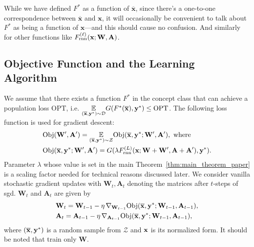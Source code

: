 While we have defined $F^*$ as a function of $\overline{\mathbf{x}}$, since there's a one-to-one correspondence between $\overline{\mathbf{x}}$ and $\mathbf{x}$, it will occasionally be convenient to talk about $F^*$ as being a function of $\mathbf{x}$---and this should cause no confusion. And similarly for other functions like $F_{\mathrm{rnn}}^{(\ell)}(\mathbf{x}; \mathbf{W}, \mathbf{A})$.

\subsection{Objective Function and the Learning Algorithm}
We assume that there exists a function $F^{\ast}$ in the concept class that can achieve a population loss $\mathrm{OPT}$, i.e. $\underset{\left(\overline{\mathbf{x}}, \mathbf{y}^{\ast}\right) \sim \mathcal{D}}{\mathbb{E}} G(F^{\ast}(\overline{\mathbf{x}}), \mathbf{y}^{\ast}) \le \mathrm{OPT}$. The following loss function is used for gradient descent: 
\begin{align*}
    &\mathrm{Obj}(\mathbf{W}', \mathbf{A}') = \underset{\left(\overline{\mathbf{x}}, \mathbf{y}^{\ast}\right) \sim \mathcal{Z}}{\mathbb{E}} \mathrm{Obj}(\overline{\mathbf{x}}, \mathbf{y}^{\ast};  \mathbf{W}',  \mathbf{A}'), \text{  where} \\&
    \mathrm{Obj}(\overline{\mathbf{x}}, \mathbf{y}^{\ast};  \mathbf{W}',  \mathbf{A}') = G(\lambda F_{\mathrm{rnn}}^{(L)}(\mathbf{x};  \mathbf{W}+\mathbf{W}', \mathbf{A} + \mathbf{A}'), \mathbf{y}^{\ast} ).
\end{align*}
Parameter $\lambda$ whose value is set in the main Theorem~\ref{thm:main_theorem_paper} is a scaling factor needed for technical reasons discussed later. We consider vanilla stochastic gradient updates with $\mathbf{W}_t, \mathbf{A}_t$ denoting the matrices after $t$-steps of sgd. $\mathbf{W}_t$ and $\mathbf{A}_t$ are given by
\begin{align*}
	& \mathbf{W}_t = \mathbf{W}_{t-1} - \eta \, \nabla_{\mathbf{W}_{t-1}} \mathrm{Obj}(\overline{\mathbf{x}}, \mathbf{y}^{\ast};  \mathbf{W}_{t-1},  \mathbf{A}_{t-1}),
	\\&\mathbf{A}_t = \mathbf{A}_{t-1} - \eta \, \nabla_{\mathbf{A}_{t-1}} \mathrm{Obj}(\overline{\mathbf{x}}, \mathbf{y}^{\ast};  \mathbf{W}_{t-1},  \mathbf{A}_{t-1}),
\end{align*} 
where $(\overline{\mathbf{x}}, \mathbf{y}^{\ast})$ is a random sample from $\mathcal{Z}$ and $\mathbf{x}$ is its normalized form. It should be noted that \cite{allen2019can} train only $\mathbf{W}$.



